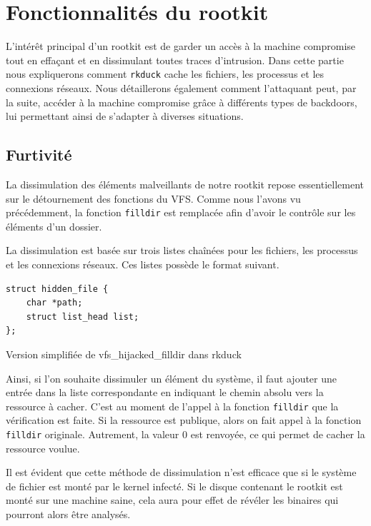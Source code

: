 \documentclass[12pt]{article}
\begin{document}
\section{Fonctionnalités du rootkit}
    
    L'intérêt principal d'un rootkit est de garder un accès à la machine compromise tout en effaçant et en dissimulant toutes traces d'intrusion. Dans cette partie nous expliquerons comment \texttt{rkduck} cache les fichiers, les processus et les connexions réseaux. Nous détaillerons également comment l'attaquant peut, par la suite, accéder à la machine compromise grâce à différents types de backdoors, lui permettant ainsi de s'adapter à diverses situations.

    \subsection{Furtivité}
        
        	La dissimulation des éléments malveillants de notre rootkit repose essentiellement sur le détournement des fonctions du VFS. Comme nous l'avons vu précédemment, la fonction \texttt{filldir} est remplacée afin d'avoir le contrôle sur les éléments d'un dossier. 

			La dissimulation est basée sur trois listes chaînées pour les fichiers, les processus et les connexions réseaux. Ces listes possède le format suivant.

\begin{listing}[H]
\begin{verbatim}
struct hidden_file {
    char *path;
    struct list_head list;
};
\end{verbatim}
\caption{Version simplifiée de vfs\_hijacked\_filldir dans rkduck}
\label{listing:3}
\end{listing}

			Ainsi, si l'on souhaite dissimuler un élément du système, il faut ajouter une entrée dans la liste correspondante en indiquant le chemin absolu vers la ressource à cacher. C'est au moment de l'appel à la fonction \texttt{filldir} que la vérification est faite. Si la ressource est publique, alors on fait appel à la fonction \texttt{filldir} originale. Autrement, la valeur 0 est renvoyée, ce qui permet de cacher la ressource voulue.

			Il est évident que cette méthode de dissimulation n'est efficace que si le système de fichier est monté par le kernel infecté. Si le disque contenant le rootkit est monté sur une machine saine, cela aura pour effet de révéler les binaires qui pourront alors être analysés.
\end{document}
